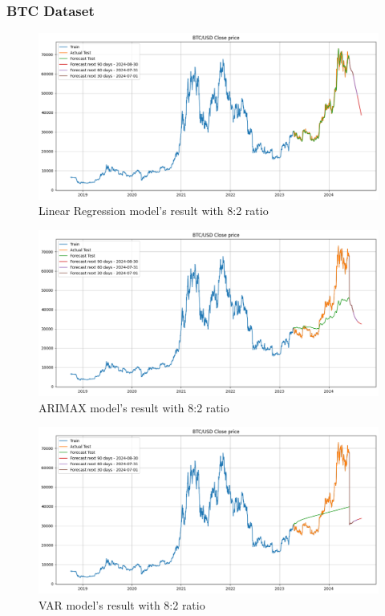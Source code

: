 \documentclass{ieeeojies}
\begin{document}
\subsubsection{BTC Dataset}
\begin{figure}[H]
    \centering 
    \includegraphics[width=0.8\linewidth]{./././visualize/LinearRegression/BTC-80-20.png} 
    \caption{Linear Regression model’s result with 8:2 ratio}
    \label{fig:12}
\end{figure}
\begin{figure}[H]
    \centering 
    \includegraphics[width=0.8\linewidth]{./././visualize/ARIMAX/BTC-80-20.png} 
    \caption{ARIMAX model’s result with 8:2 ratio}
    \label{fig:13}
\end{figure}
\begin{figure}[H]
    \centering 
    \includegraphics[width=0.8\linewidth]{./././visualize/VAR/BTC-80-20.png} 
    \caption{VAR model’s result with 8:2 ratio}
    \label{fig:14}
\end{figure}
\end{document}
